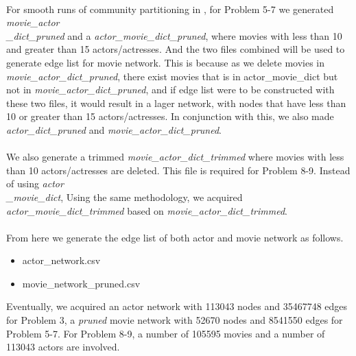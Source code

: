 \paragraph{}
For smooth runs of community partitioning in , for Problem 5-7 we generated \textit{movie\_actor\\\_dict\_pruned} and a \textit{actor\_movie\_dict\_pruned}, where movies with less than 10 and greater than 15 actors/actresses. And the two files combined will be used to generate edge list for movie network. This is because as we delete movies in \textit{movie\_actor\_dict\_pruned}, there exist movies that is in actor\_movie\_dict but not in \textit{movie\_actor\_dict\_pruned}, and if edge list were to be constructed with these two files, it would result in a lager network, with nodes that have less than 10 or greater than 15 actors/actresses. In conjunction with this, we also made \textit{actor\_dict\_pruned} and \textit{movie\_actor\_dict\_pruned}.
\paragraph{}
We also generate a trimmed \textit{movie\_actor\_dict\_trimmed} where movies with less than 10 actors/actresses are deleted. This file is required for Problem 8-9. Instead of using \textit{actor\\\_movie\_dict}, Using the same methodology, we acquired \textit{actor\_movie\_dict\_trimmed} based on \textit{movie\_actor\_dict\_trimmed}.
 
\paragraph{}
From here we generate the edge list of both actor and movie network as follows.
\begin{itemize}
	\item actor\_network.csv
	\item movie\_network\_pruned.csv
\end{itemize}
Eventually, we acquired an actor network with 113043 nodes and 35467748 edges for Problem 3, a \textit{pruned} movie network with 52670 nodes and 8541550 edges for Problem 5-7. For Problem 8-9, a number of 105595 movies and a number of 113043 actors are involved.


